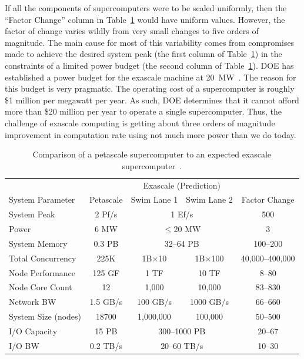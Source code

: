 \documentclass[conference]{IEEEtran}
\newcommand*{\lcite}[1]{~\cite{#1}}
\begin{document}
If all the components of supercomputers were to be scaled uniformly, then
the ``Factor Change'' column in Table~\ref{table:PetascaleVsExascale} would
have uniform values.  However, the factor of change varies wildly from very
small changes to five orders of magnitude.  The main cause for most of this
variability comes from compromises made to achieve the desired system peak
(the first column of Table~\ref{table:PetascaleVsExascale}) in the
constraints of a limited power budget (the second column of
Table~\ref{table:PetascaleVsExascale}).  DOE has established a power budget
for the exascale machine at 20~MW\lcite{ExascaleArchitecturesReport}.  The
reason for this budget is very pragmatic.  The operating cost of a
supercomputer is roughly \$1 million per megawatt per year.  As such, DOE
determines that it cannot afford more than \$20 million per year to operate
a single supercomputer.  Thus, the challenge of exascale computing is
getting about three orders of magnitude improvement in computation rate
using not much more power than we do today.

\begin{table}[htdp]
  \centering
  \caption{Comparison of a petascale supercomputer to an expected exascale
    supercomputer\lcite{ScientificDiscoveryExascale2011}.}
  \label{table:PetascaleVsExascale}
  \begin{tabular}{@{}lcccc@{}}
    \toprule
    & & \multicolumn{2}{c}{Exascale (Prediction)} & \\
    System Parameter & Petascale & Swim Lane 1 & Swim Lane 2 & Factor Change \\
    \midrule
    System Peak & 2 Pf/s & \multicolumn{2}{c}{1 Ef/s} & 500 \\
    Power & 6 MW & \multicolumn{2}{c}{$\le$20 MW} & 3\\
    System Memory & 0.3 PB & \multicolumn{2}{c}{32--64 PB} & 100--200 \\ %
    Total Concurrency & 225K & 1B$\times$10 & 1B$\times$100 & 40,000--400,000 \\
    Node Performance & 125 GF & 1 TF & 10 TF & 8--80\\
    Node Core Count & 12 & 1,000 & 10,000 & 83--830 \\
    Network BW & 1.5 GB/s & 100 GB/s & 1000 GB/s & 66--660 \\
    System Size (nodes) & 18700 & 1,000,000 & 100,000 & 50--500 \\
    I/O Capacity & 15 PB & \multicolumn{2}{c}{300--1000 PB} & 20--67\\
    I/O BW & 0.2 TB/s & \multicolumn{2}{c}{20--60 TB/s} & 10--30 \\
    \bottomrule
  \end{tabular}
\end{table}
\end{document}
